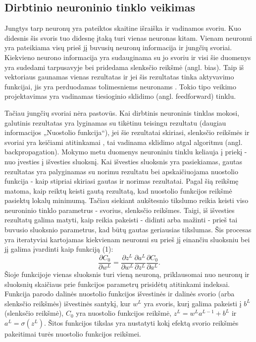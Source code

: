 \documentclass{VUMIFPSbakalaurinis}
\begin{document}
\subsection{Dirbtinio neuroninio tinklo veikimas}
Jungtys tarp neuronų yra pateiktos skaitine išraiška ir vadinamos svoriu. Kuo didesnis šis svoris tuo didesnę įtaką turi vienas neuronas kitam.
Vienam neuronui yra pateikiama visų prieš jį buvusių neuronų informacija ir jungčių svoriai. Kiekvieno neurono informacija yra sudauginama su
jo svoriu ir visi šie duomenys yra sudedami tarpusavyje bei pridedama slenksčio reikšmė (angl. bias). Taip iš vektoriaus gaunamas vienas rezultatas ir jei šis rezultatas tinka aktyvavimo
funkcijai, jis yra perduodamas tolimesniems neuronams \cite{shiffman2012nature}. Tokio tipo veikimo projektavimas yra vadinamas tiesioginio sklidimo (angl. feedforward) tinklu.

Tačiau jungčių svoriai nėra pastovūs. Kai dirbtinis neuroninis tinklas mokosi, galutinis rezultatas yra lyginamas su tikėtinu teisingu rezultatu (daugiau informacijos „Nuostolio funkcija“), jei šie
rezultatai skiriasi, slenksčio reikšmės ir svoriai yra keičiami atitinkamai \cite{backpropogation}, tai vadinama sklidimo atgal algoritmu (angl. backpropagation).
Mokymo metu duomenys neuroniniu tinklu keliauja į priekį - nuo įvesties į išvesties sluoksnį. Kai išvesties sluoksnis yra pasiekiamas, gautas rezultatas yra palyginamas su norimu rezultatu bei 
apskaičiuojama nuostolio funkcija - kaip stipriai skiriasi gautas ir norimas rezultatai. Pagal šią reikšmę matoma, kaip reiktų keisti gautą rezultatą, kad nuostolio funkcijos reikšmė pasiektų lokalų 
minimumą. Tačiau siekiant aukštesnio tikslumo reikia keisti viso neuroninio tinklo parametrus - svorius, slenksčio reikšmes. Taigi, iš išvesties rezultatų galima matyti, kaip reikia pakeisti - 
didinti arba mažinti - prieš tai buvusio sluoksnio parametrus, kad būtų gautas geriausias tikslumas. Šis procesas yra iteratyviai kartojamas kiekvienam neuronui su prieš jį einančiu sluoksniu bei jį galima įvardinti kaip funkciją (1):
\begin{equation}
\frac{\partial{C_{0}}}{\partial{w^{L}}} = \frac{\partial{z^{L}}}{\partial{w^{L}}} \frac{\partial{a^{L}}}{\partial{z^{L}}} \frac{\partial{C_{0}}}{\partial{a^{L}}}.
\end{equation}
Šioje funkcijoje vienas sluoksnis turi vieną neuroną, priklausomai nuo neuronų ir sluoksnių skaičiaus prie funkcijos parametrų prisidėtų atitinkami indeksai. Funkcija parodo dalinės nuostolio funkcijos 
išvestinės ir dalinės svorio (arba slenksčio reikšmės) išvestinės santykį, kur \(w^{L}\) yra svoris, kurį galima pakeisti į \(b^{L}\) (slenksčio reikšmė), \(C_{0}\) yra nuostolio funkcijos reikšmė, 
\(z^{L} = w^{L}a^{L-1}+b^{L}\) ir \(a^{L}=\sigma(z^{L})\). Šitos funkcijos tikslas yra nustatyti kokį efektą svorio reikšmės pakeitimai turės nuostolio funkcijos reikšmei.
\end{document}
